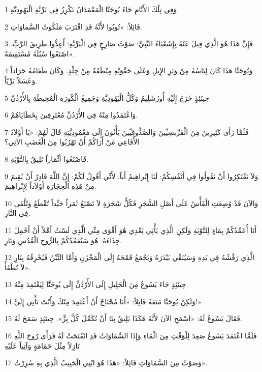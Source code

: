 \par 1 وَفِي تِلْكَ الأَيَّامِ جَاءَ يُوحَنَّا الْمَعْمَدَانُ يَكْرِزُ فِي بَرِّيَّةِ الْيَهُودِيَّةِ
\par 2 قَائِلاً: «تُوبُوا لأَنَّهُ قَدِ اقْتَرَبَ مَلَكُوتُ السَّماوَاتِ.
\par 3 فَإِنَّ هَذَا هُوَ الَّذِي قِيلَ عَنْهُ بِإِشَعْيَاءَ النَّبِيِّ: صَوْتُ صَارِخٍ فِي الْبَرِّيَّةِ: أَعِدُّوا طَرِيقَ الرَّبِّ. اصْنَعُوا سُبُلَهُ مُسْتَقِيمَةً».
\par 4 وَيُوحَنَّا هَذَا كَانَ لِبَاسُهُ مِنْ وَبَرِ الإِبِلِ وَعَلَى حَقْوَيْهِ مِنْطَقَةٌ مِنْ جِلْدٍ. وَكَانَ طَعَامُهُ جَرَاداً وَعَسَلاً بَرِّيّاً.
\par 5 حِينَئِذٍ خَرَجَ إِلَيْهِ أُورُشَلِيمُ وَكُلُّ الْيَهُودِيَّةِ وَجَمِيعُ الْكُورَةِ الْمُحِيطَةِ بِالأُرْدُنّ
\par 6 وَاعْتَمَدُوا مِنْهُ فِي الأُرْدُنِّ مُعْتَرِفِينَ بِخَطَايَاهُمْ.
\par 7 فَلَمَّا رَأَى كَثِيرِينَ مِنَ الْفَرِّيسِيِّينَ وَالصَّدُّوقِيِّينَ يَأْتُونَ إِلَى مَعْمُودِيَّتِهِ قَالَ لَهُمْ: «يَا أَوْلاَدَ الأَفَاعِي مَنْ أَرَاكُمْ أَنْ تَهْرُبُوا مِنَ الْغَضَبِ الآتِي؟
\par 8 فَاصْنَعُوا أَثْمَاراً تَلِيقُ بِالتَّوْبَةِ.
\par 9 وَلاَ تَفْتَكِرُوا أَنْ تَقُولُوا فِي أَنْفُسِكُمْ: لَنَا إِبْراهِيمُ أَباً. لأَنِّي أَقُولُ لَكُمْ: إِنَّ اللَّهَ قَادِرٌ أَنْ يُقِيمَ مِنْ هَذِهِ الْحِجَارَةِ أَوْلاَداً لِإِبْراهِيمَ.
\par 10 وَالآنَ قَدْ وُضِعَتِ الْفَأْسُ عَلَى أَصْلِ الشَّجَرِ فَكُلُّ شَجَرَةٍ لاَ تَصْنَعُ ثَمَراً جَيِّداً تُقْطَعُ وَتُلْقَى فِي النَّارِ.
\par 11 أَنَا أُعَمِّدُكُمْ بِمَاءٍ لِلتَّوْبَةِ وَلَكِنِ الَّذِي يَأْتِي بَعْدِي هُوَ أَقْوَى مِنِّي الَّذِي لَسْتُ أَهْلاً أَنْ أَحْمِلَ حِذَاءَهُ. هُوَ سَيُعَمِّدُكُمْ بِالرُّوحِ الْقُدُسِ وَنَارٍ.
\par 12 الَّذِي رَفْشُهُ فِي يَدِهِ وَسَيُنَقِّي بَيْدَرَهُ وَيَجْمَعُ قَمْحَهُ إِلَى الْمَخْزَنِ وَأَمَّا التِّبْنُ فَيُحْرِقُهُ بِنَارٍ لاَ تُطْفَأُ».
\par 13 حِينَئِذٍ جَاءَ يَسُوعُ مِنَ الْجَلِيلِ إِلَى الأُرْدُنِّ إِلَى يُوحَنَّا لِيَعْتَمِدَ مِنْهُ.
\par 14 وَلَكِنْ يُوحَنَّا مَنَعَهُ قَائِلاً: «أَنَا مُحْتَاجٌ أَنْ أَعْتَمِدَ مِنْكَ وَأَنْتَ تَأْتِي إِلَيَّ!»
\par 15 فَقَالَ يَسُوعُ لَهُ: «اسْمَحِ الآنَ لأَنَّهُ هَكَذَا يَلِيقُ بِنَا أَنْ نُكَمِّلَ كُلَّ بِرٍّ». حِينَئِذٍ سَمَحَ لَهُ.
\par 16 فَلَمَّا اعْتَمَدَ يَسُوعُ صَعِدَ لِلْوَقْتِ مِنَ الْمَاءِ وَإِذَا السَّمَاوَاتُ قَدِ انْفَتَحَتْ لَهُ فَرَأَى رُوحَ اللَّهِ نَازِلاً مِثْلَ حَمَامَةٍ وَآتِياً عَلَيْهِ
\par 17 وَصَوْتٌ مِنَ السَّمَاوَاتِ قَائِلاً: «هَذَا هُوَ ابْنِي الْحَبِيبُ الَّذِي بِهِ سُرِرْتُ».

